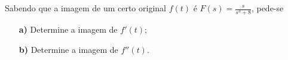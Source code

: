 \linespread{1.5}
Sabendo que a imagem de um certo original $f(t)$ é $F(s) = \frac{s}{s^3 + 8}$, pede-se
\begin{itemize}
    \item[\textbf{a)}] Determine a imagem de $f'(t)$;
    \item[\textbf{b)}] Determine a imagem de $f''(t)$.
\end{itemize}